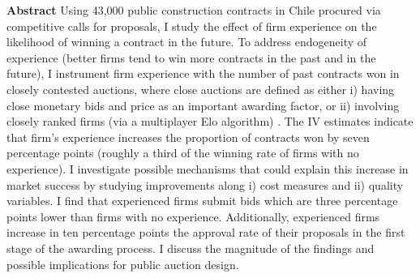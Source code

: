 

\centering
\textbf{Abstract}
\justify
\footnotesize
Using 43,000 public construction contracts in Chile procured via competitive calls for proposals, I study the effect of firm experience on the likelihood of winning a contract in the future. To address endogeneity of experience (better firms tend to win more contracts in the past and in the future), I instrument firm experience with the number of past contracts won in closely contested auctions, where close auctions are defined as either i) having close monetary bids and price as an important awarding factor, or ii) involving closely ranked firms (via a multiplayer Elo algorithm) . The IV estimates indicate that firm's experience increases the proportion of contracts won by seven percentage points (roughly a third of the winning rate of firms with no experience). I investigate possible mechanisms that could explain this increase in market success by studying improvements along i) cost measures and ii) quality variables. I find that experienced firms submit bids which are three percentage points lower than firms with no experience. Additionally, experienced firms increase in ten percentage points the approval rate of their proposals in the first stage of the awarding process. I discuss the magnitude of the findings and possible implications for public auction design.
